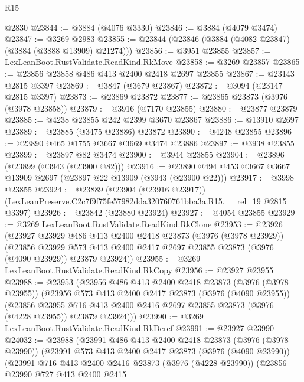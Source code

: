 \begin{lexlean}{R15}
\begin{coremodule}
    @2830
@23844 := @3884 (@4076 @3330)
@23846 := @3884 (@4079 @3474)
@23847 := @3269 @2983
@23855 := @23844 (@23846 (@3884 (@4082 @23847) (@3884 (@3888 @13909) @21274)))
@23856 := @3951 @23855
@23857 := LexLeanBoot.RustValidate.ReadKind.RkMove
@23858 := @3269 @23857
@23865 := @23856 @23858 @486 @413 @2400 @2418 @2697 @23855
@23867 := @23143 @2815 @3397
@23869 := @3847 (@3679 @23867)
@23872 := @3094 (@23147 @2815 @3397)
@23873 := @23869 @23872
@23877 := @23865 @23873 (@3976 (@3978 @23858))
@23879 := @3916 (@7170 @23855)
@23880 := @23877 @23879
@23885 := @4238 @23855 @242 @2399 @3670 @23867
@23886 := @13910 @2697
@23889 := @23885 (@3475 @23886) @23872
@23890 := @4248 @23855
@23896 := @23890 @465 @1755 @3667 @3669 @3474 @23886
@23897 := @3938 @23855
@23899 := @23897 @82 @3474
@23900 := @3944 @23855
@23904 := @23896 (@23899 (@3943 (@23900 @82)))
@23916 := @23890 @494 @453 @3667 @3667 @13909 @2697 (@23897 @22 @13909 (@3943 (@23900 @22)))
@23917 := @3998 @23855
@23924 := @23889
    (@23904 (@23916 @23917))
    (LexLeanPreserve.C2c7f9f75fe57982dda320760761bba3a.R15.__rel_19 @2815 @3397)
@23926 := @23842 (@23880 @23924)
@23927 := @4054 @23855
@23929 := @3269 LexLeanBoot.RustValidate.ReadKind.RkClone
@23953 := @23926
    (@23927
      @23929
      @486
      @413
      @2400
      @2418
      @23873
      (@3976 (@3978 @23929))
      (@23856
        @23929
        @573
        @413
        @2400
        @2417
        @2697
        @23855
        @23873
        (@3976 (@4090 @23929))
        @23879
        @23924))
@23955 := @3269 LexLeanBoot.RustValidate.ReadKind.RkCopy
@23956 := @23927 @23955
@23988 := @23953
    (@23956
      @486
      @413
      @2400
      @2418
      @23873
      (@3976 (@3978 @23955))
      (@23956
        @573
        @413
        @2400
        @2417
        @23873
        (@3976 (@4090 @23955))
        (@23856
          @23955
          @716
          @413
          @2400
          @2416
          @2697
          @23855
          @23873
          (@3976 (@4228 @23955))
          @23879
          @23924)))
@23990 := @3269 LexLeanBoot.RustValidate.ReadKind.RkDeref
@23991 := @23927 @23990
@24032 := @23988
    (@23991
      @486
      @413
      @2400
      @2418
      @23873
      (@3976 (@3978 @23990))
      (@23991
        @573
        @413
        @2400
        @2417
        @23873
        (@3976 (@4090 @23990))
        (@23991
          @716
          @413
          @2400
          @2416
          @23873
          (@3976 (@4228 @23990))
          (@23856
            @23990
            @727
            @413
            @2400
            @2415

\end{coremodule}
\end{lexlean}
